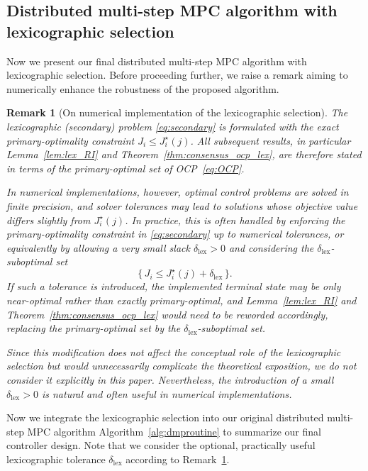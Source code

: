 \documentclass[12pt,draftcls,onecolumn]{IEEEtran}
\newtheorem{remark}{Remark}
\begin{document}
\subsection{Distributed multi-step MPC algorithm with lexicographic selection}
Now we present our final distributed multi-step MPC algorithm with lexicographic selection.
Before proceeding further, we raise a remark aiming to numerically enhance the robustness of the proposed algorithm.

\begin{remark}[On numerical implementation of the lexicographic selection]\label{rem:lex_tolerance}
The lexicographic (secondary) problem \eqref{eq:secondary} is formulated with the exact primary-optimality constraint \(J_i \le J_i^\star(j)\).
All subsequent results, in particular Lemma~\ref{lem:lex_RI} and Theorem~\ref{thm:consensus_ocp_lex}, are therefore stated in terms of the \emph{primary-optimal set} of OCP~\eqref{eq:OCP}.

In numerical implementations, however, optimal control problems are solved in finite precision, and solver tolerances may lead to solutions whose objective value differs slightly from \(J_i^\star(j)\). In practice, this is often handled by enforcing the primary-optimality constraint in \eqref{eq:secondary} up to numerical tolerances, or
equivalently by allowing a very small slack \(\delta_{\mathrm{lex}}>0\) and considering the \(\delta_{\mathrm{lex}}\)-suboptimal set
\[
\{\, J_i \le J_i^\star(j) + \delta_{\mathrm{lex}} \,\}.
\]
If such a tolerance is introduced, the implemented terminal state may be only \emph{near-optimal} rather than exactly primary-optimal, and Lemma~\ref{lem:lex_RI} and Theorem~\ref{thm:consensus_ocp_lex} would need to be reworded accordingly, replacing the primary-optimal set by the \(\delta_{\mathrm{lex}}\)-suboptimal set.

Since this modification does not affect the conceptual role of the lexicographic selection but would unnecessarily complicate the theoretical exposition, we do not consider it explicitly in this paper. Nevertheless, the introduction of a small \(\delta_{\mathrm{lex}}>0\) is natural and often useful in numerical implementations.
\end{remark}

Now we integrate the lexicographic selection into our original distributed multi-step MPC algorithm Algorithm~\ref{alg:dmproutine} to summarize our final controller design.
Note that we consider the optional, practically useful lexicographic tolerance $\delta_{\mathrm{lex}}$ according to Remark~\ref{rem:lex_tolerance}.
\end{document}
